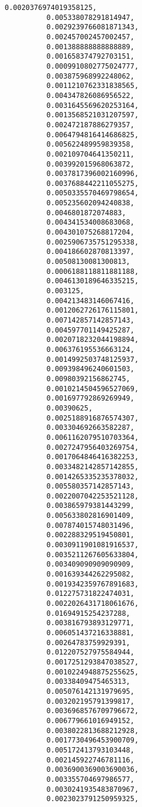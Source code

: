 \documentclass[11pt]{article}
\begin{document}
\begin{Verbatim}[commandchars=\\\{\}]
          0.0020376974019358125,
          0.005338078291814947,
          0.0029239766081871343,
          0.002457002457002457,
          0.001388888888888889,
          0.001658374792703151,
          0.0009910802775024777,
          0.003875968992248062,
          0.0011210762331838565,
          0.004347826086956522,
          0.0031645569620253164,
          0.0013568521031207597,
          0.002472187886279357,
          0.0064794816414686825,
          0.005622489959839358,
          0.002109704641350211,
          0.003992015968063872,
          0.0037817396002160996,
          0.0037688442211055275,
          0.0050335570469798654,
          0.005235602094240838,
          0.0046801872074883,
          0.004341534008683068,
          0.004301075268817204,
          0.0025906735751295338,
          0.004186602870813397,
          0.00508130081300813,
          0.0006188118811881188,
          0.0046130189646335215,
          0.003125,
          0.004213483146067416,
          0.0012062726176115801,
          0.007142857142857143,
          0.004597701149425287,
          0.0020718232044198894,
          0.006376195536663124,
          0.0014992503748125937,
          0.009398496240601503,
          0.00980392156862745,
          0.0010214504596527069,
          0.001697792869269949,
          0.00390625,
          0.0025188916876574307,
          0.003304692663582287,
          0.0061162079510703364,
          0.0027247956403269754,
          0.0017064846416382253,
          0.0033482142857142855,
          0.0014265335235378032,
          0.005580357142857143,
          0.0022007042253521128,
          0.003865979381443299,
          0.005633802816901409,
          0.007874015748031496,
          0.002288329519450801,
          0.0030911901081916537,
          0.0035211267605633804,
          0.003409090909090909,
          0.001639344262295082,
          0.0019342359767891683,
          0.012275731822474031,
          0.0022026431718061676,
          0.01694915254237288,
          0.003816793893129771,
          0.006051437216338881,
          0.00264783759929391,
          0.012207527975584944,
          0.0017251293847038527,
          0.0010224948875255625,
          0.00338409475465313,
          0.005076142131979695,
          0.003202195791399817,
          0.0036968576709796672,
          0.006779661016949152,
          0.0038022813688212928,
          0.0017730496453900709,
          0.005172413793103448,
          0.002145922746781116,
          0.0036900369003690036,
          0.003355704697986577,
          0.0030241935483870967,
          0.0023023791250959325,

\end{Verbatim}
\end{document}
